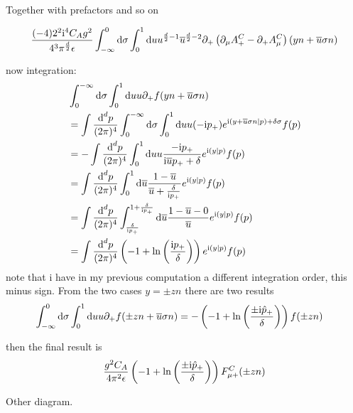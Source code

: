 Together with prefactors and so on

\begin{align}
	\frac{ (-4)2^2\text{i}^4 C_A g^2 }{4^3\pi^{\frac{d}{2}}\epsilon} \int_{-\infty}^{0}\text{d} \sigma\int_0^1 \text{d} u u^{\frac{d}{2}-1}\overline u ^{\frac{d}{2}-2} \partial_+\left( \partial_\mu A^C_+ - \partial_+ A^C_\mu \right)(yn+\overline u \sigma n)
\end{align}

now integration: 
\begin{align}
	&
	\int_{0}^{-\infty} \text{d} \sigma \int_0^1 \text{d} u u \partial_+ f(yn+\overline u \sigma n)
	\\
	&=
	\int \frac{\text{d} ^d p}{(2\pi)^4}\int_{0}^{-\infty} \text{d} \sigma \int_0^1 \text{d} u u (-\text{i}p_{+}) e^{\text{i} (y+\overline u \sigma n|p)+\delta \sigma} f(p)
	\\
	&=
	-\int \frac{\text{d} ^d p}{(2\pi)^4} \int_0^1 \text{d} u u \frac{-\text{i}p_{+}}{\text{i} \overline u p_{+} + \delta} e^{\text{i} (y|p)} f(p)
	\\
	&=
	\int \frac{\text{d} ^d p}{(2\pi)^4}\int_0^1 \text{d} \overline u \frac{1-\overline u}{ \overline u + \frac{\delta}{\text{i}p_{+}}} e^{\text{i} (y|p)} f(p)
	\\
	&=
	\int \frac{\text{d} ^d p}{(2\pi)^4}\int_{\frac{\delta}{\text{i}p_{+}}}^{1+\frac{\delta}{\text{i}p_{+}}} \text{d} \overline u \frac{1-\overline u-0}{ \overline u } e^{\text{i} (y|p)} f(p)
	\\
	&=
	\int \frac{\text{d} ^d p}{(2\pi)^4}\left(-1+\ln\left(\frac{\text{i}p_{+}}{\delta}\right)\right) e^{\text{i} (y|p)} f(p)
\end{align}
note that i have in my previous computation a different integration order, this minus sign.
From the two cases $y=\pm zn$ there are two results
\begin{align}
	\int_{-\infty}^{0} \text{d} \sigma \int_0^1 \text{d} u u \partial_+ f(\pm zn+\overline u \sigma n)	
	&=
	-\left(-1+\ln\left(\frac{\pm\text{i} \hat p_{+}}{\delta}\right)\right) f(\pm zn)
\end{align}



then the final result is
\begin{align}
	\frac{  g^2 C_A}{4\pi^2 \epsilon} \left(-1+\ln\left(\frac{\pm\text{i} \hat p_{+}}{\delta}\right)\right)F^C_{\mu +}(\pm zn)
\end{align}



Other diagram.


